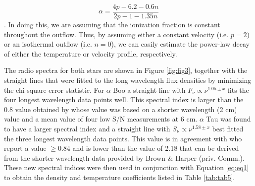 \documentclass[iop]{emulateapj}
\begin{document}
\begin{equation}
\alpha = \frac{4p -6.2 -0.6n}{2p-1-1.35n}
\label{eq:eq1}
\end{equation}
\citep[e.g.][]{1987ApJ...312..813S}. In doing this, we are assuming that the ionization fraction is constant throughout the outflow. Thus, by assuming either a constant velocity (i.e. $p=2$) or an isothermal outflow (i.e. $n=0$), we can easily estimate the power-law decay of either the temperature or velocity profile, respectively. 

The radio spectra for both stars are shown in Figure \ref{fig:fig3}, together with the straight lines that were fitted to the long wavelength flux densities by minimizing the chi-square error statistic. For $\alpha$ Boo a straight line with $F_{\nu} \propto \nu ^{1.05 \pm x}$ fits the four longest wavelength data points well. This spectral index is larger than the 0.8 value obtained by \cite{1986AJ.....91..602D} whose value was based on a shorter wavelength (2 cm) value and a mean value of four low S/N measurements at 6 cm. $\alpha$ Tau was found to have a larger spectral index and a straight line with $S_{\nu} \propto \nu ^{1.58 \pm x}$ best fitted the three longest wavelength data points. This value is in agreement with \cite{1986AJ.....91..602D} who report a value $\ge 0.84$ and is lower than the value of 2.18 that can be derived from the shorter wavelength data provided by Brown \& Harper (priv. Comm.). These new spectral indices were then used in conjunction with Equation \ref{eq:eq1} to obtain the density and temperature coefficients listed in Table \ref{tab:tab5}. 
\end{document}
